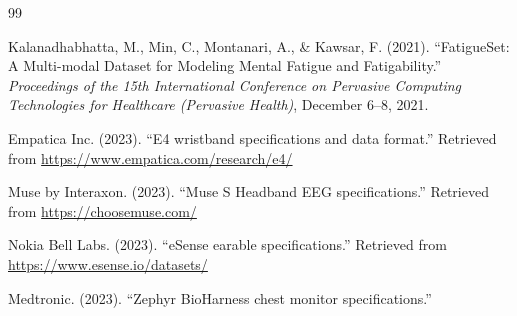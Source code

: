 \documentclass[12pt, a4paper, oneside, openany]{report}
\begin{document}

\appendix








\begin{thebibliography}{99}

 Kalanadhabhatta, M., Min, C., Montanari, A., \& Kawsar, F. (2021).
``FatigueSet: A Multi-modal Dataset for Modeling Mental Fatigue and Fatigability.''
\textit{Proceedings of the 15th International Conference on Pervasive Computing Technologies for Healthcare (Pervasive Health)},
December 6--8, 2021.

 Empatica Inc. (2023). ``E4 wristband specifications and data format.''
Retrieved from \url{https://www.empatica.com/research/e4/}

 Muse by Interaxon. (2023). ``Muse S Headband EEG specifications.''
Retrieved from \url{https://choosemuse.com/}

 Nokia Bell Labs. (2023). ``eSense earable specifications.''
Retrieved from \url{https://www.esense.io/datasets/}

 Medtronic. (2023). ``Zephyr BioHarness chest monitor specifications.''

\end{thebibliography}
\end{document}
